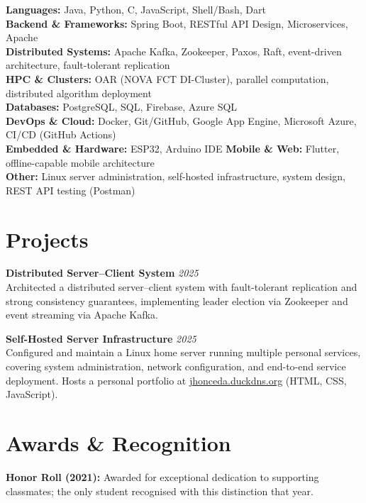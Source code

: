 \documentclass[a4paper,10pt]{article}
\newcommand{\entryspace}{\vspace{3pt}}
\begin{document}
\noindent\textbf{Languages:} Java, Python, C, JavaScript, Shell/Bash, Dart\\
\noindent\textbf{Backend \& Frameworks:} Spring Boot, RESTful API Design, Microservices, Apache\\
\noindent\textbf{Distributed Systems:} Apache Kafka, Zookeeper, Paxos, Raft, event-driven architecture, fault-tolerant replication\\
\noindent\textbf{HPC \& Clusters:} OAR (NOVA FCT DI-Cluster), parallel computation, distributed algorithm deployment\\
\noindent\textbf{Databases:} PostgreSQL, SQL, Firebase, Azure SQL\\
\noindent\textbf{DevOps \& Cloud:} Docker, Git/GitHub, Google App Engine, Microsoft Azure, CI/CD (GitHub Actions)\\
\noindent\textbf{Embedded \& Hardware:} ESP32, Arduino IDE \quad \textbf{Mobile \& Web:} Flutter, offline-capable mobile architecture\\
\noindent\textbf{Other:} Linux server administration, self-hosted infrastructure, system design, REST API testing (Postman)

\section*{Projects}

\noindent\textbf{Distributed Server--Client System} \hfill \textit{2025}\\
Architected a distributed server--client system with fault-tolerant replication and strong consistency guarantees, implementing leader election via Zookeeper and event streaming via Apache Kafka.

\entryspace

\noindent\textbf{Self-Hosted Server Infrastructure} \hfill \textit{2025}\\
Configured and maintain a Linux home server running multiple personal services, covering system administration, network configuration, and end-to-end service deployment. Hosts a personal portfolio at \href{https://jhonceda.duckdns.org}{jhonceda.duckdns.org} (HTML, CSS, JavaScript).

\section*{Awards \& Recognition}
\textbf{Honor Roll (2021):} Awarded for exceptional dedication to supporting classmates; the only student recognised with this distinction that year.
\end{document}
